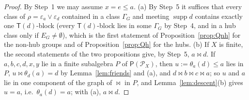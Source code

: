 \documentclass[11pt]{amsart}
\theoremstyle{definition}
\renewcommand{\P}{\mathcal{P}}      %
\newcommand{\PA}{\mathsf{P}}         %
\newcommand{\supp}{\operatorname{supp}}
\newcommand{\T}{\mathsf{T}}
\newcommand{\mt}{\bowtie}      %
\begin{document}
\begin{proof}
By Step~1 we may assume $x=e\le a$. (a) By Step~5 it suffices that every class of $\rho=\varepsilon_a\vee\varepsilon_d$ contained in a class $\Gamma_G$ and meeting $\supp d$ contains exactly one $\T(d)$-block (every $\T(d)$-block lies in some $\Gamma_G$ by Step~4, and in a hub class only if $E_G\ne\emptyset$), which is the first statement of Proposition~\ref{prop:Qnh} for the non-hub groups and of Proposition~\ref{prop:Qh} for the hubs. (b) If $X$ is finite, the second statements of the two propositions give, by Step~5, $a\mt d$. If $a,b,c,d,x,y$ lie in a finite subalgebra $P$ of $\PA(\P_X)$, then $u:=\theta_a(d)\le a$ lies in $P$, $u\mt\theta_d(a)=d$ by Lemma~\ref{lem:friends} and (a), and $d\mt b\mt c\mt a$; so $u$ and $a$ lie in one component of the graph of $\mt$ in $P$, and Lemma~\ref{lem:descent}(b) gives $u=a$, i.e.\ $\theta_a(d)=a$; with (a), $a\mt d$.


\end{proof}
\end{document}
